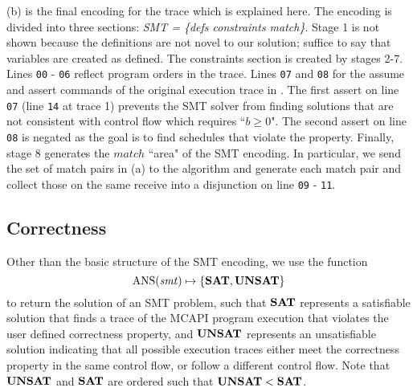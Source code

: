(b) is the final encoding for the trace which is
explained here. The encoding is divided into three sections:
\textit{SMT = \{defs constraints match\}}. Stage 1 is not shown
because the definitions are not novel to our solution; suffice to say
that variables are created as defined. The constraints section is
created by stages 2-7. Lines \texttt{00} - \texttt{06} reflect program
orders in the trace. Lines \texttt{07} and \texttt{08} for the assume
and assert commands of the original execution trace in
. The first assert on line \texttt{07} (line
\texttt{14} at trace 1) prevents the SMT solver from finding solutions
that are not consistent with control flow which requires ``$b \ge
0$". The second assert on line \texttt{08} is negated as the goal is
to find schedules that violate the property. Finally, stage 8
generates the $\mathit{match}$ ``area" of the SMT encoding. In
particular, we send the set of match pairs in (a) to
the algorithm and generate each match pair and collect those on the
same receive into a disjunction on line \texttt{09} - \texttt{11}.

\subsection{Correctness}

Other than the basic structure of the SMT encoding, we use the
function
\[\mathrm{ANS}(\mathit{smt}) \mapsto \{\mathrm{\textbf{SAT}},\mathrm{\textbf{UNSAT}}\} \]
to return the solution of an SMT problem, such that
$\mathrm{\textbf{SAT}}$ represents a satisfiable solution that finds a
trace of the MCAPI program execution that violates the user defined
correctness property, and $\mathrm{\textbf{UNSAT}}$ represents an
unsatisfiable solution indicating that all possible execution traces
either meet the correctness property in the same control flow, or
follow a different control flow. Note that $\mathrm{\textbf{UNSAT}}$ and
$\mathrm{\textbf{SAT}}$ are ordered such that $\mathrm{\textbf{UNSAT}} <
\mathrm{\textbf{SAT}}$.

